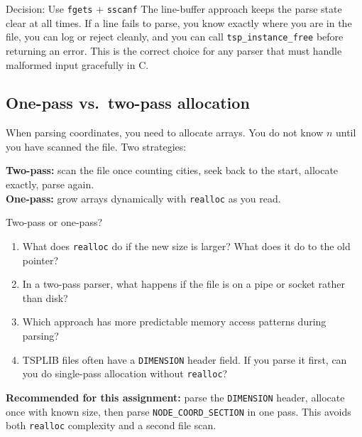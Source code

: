 \begin{goodbox}{Decision: Use \texttt{fgets} + \texttt{sscanf}}
The line-buffer approach keeps the parse state clear at all times. If a line fails to parse, you know exactly where you are in the file, you can log or reject cleanly, and you can call \texttt{tsp\_instance\_free} before returning an error. This is the correct choice for any parser that must handle malformed input gracefully in C.
\end{goodbox}

\subsection{One-pass vs.\ two-pass allocation}

When parsing coordinates, you need to allocate arrays. You do not know $n$ until you have scanned the file. Two strategies:

\textbf{Two-pass:} scan the file once counting cities, seek back to the start, allocate exactly, parse again.\\
\textbf{One-pass:} grow arrays dynamically with \texttt{realloc} as you read.

\begin{inquiry}{Two-pass or one-pass?}
\begin{enumerate}[label=\alph*.]
  \item What does \texttt{realloc} do if the new size is larger? What does it do to the old pointer?
  \item In a two-pass parser, what happens if the file is on a pipe or socket rather than disk?
  \item Which approach has more predictable memory access patterns during parsing?
  \item TSPLIB files often have a \texttt{DIMENSION} header field. If you parse it first, can you do single-pass allocation without \texttt{realloc}?
\end{enumerate}
\end{inquiry}

\textbf{Recommended for this assignment:} parse the \texttt{DIMENSION} header, allocate once with known size, then parse \texttt{NODE\_COORD\_SECTION} in one pass. This avoids both \texttt{realloc} complexity and a second file scan.

\newpage
